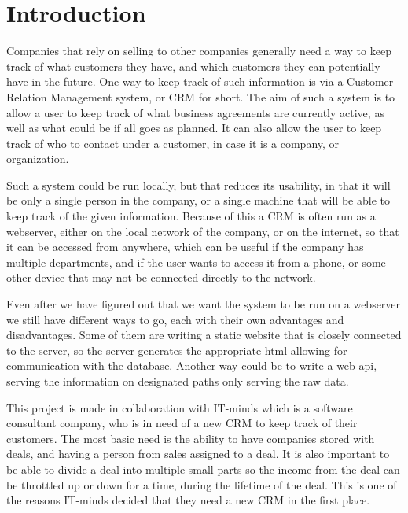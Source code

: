 \chapter{Introduction}
\label{chap:Introduction}
Companies that rely on selling to other companies generally need a way to keep track of
what customers they have, and which customers they can potentially have in the future.
One way to keep track of such information is via a Customer Relation Management system,
or CRM for short. The aim of such a system is to allow a user to keep track of what
business agreements are currently active, as well as what could be if all goes as planned.
It can also allow the user to keep track of who to contact under a customer, in case it is
a company, or organization.

Such a system could be run locally, but that reduces its usability, in that it will
be only a single person in the company, or a single machine that will be able to keep
track of the given information. Because of this a CRM is often run as a webserver, either
on the local network of the company, or on the internet, so that it can be accessed
from anywhere, which can be useful if the company has multiple departments, and if the
user wants to access it from a phone, or some other device that may not be connected
directly to the network.

Even after we have figured out that we want the system to be run on a webserver we still have
different ways to go, each with their own advantages and disadvantages. Some of them
are writing a static website that is closely connected to the server, so the server
generates the appropriate html allowing for communication with the database.
Another way could be to write a web-api, serving the information on designated paths
only serving the raw data.

This project is made in collaboration with IT-minds which is a software consultant company,
who is in need of a new CRM to keep track of their customers. The most basic need is
the ability to have companies stored with deals, and having a person from sales assigned
to a deal. It is also important to be able to divide a deal into multiple small parts
so the income from the deal can be throttled up or down for a time, during the lifetime
of the deal. This is one of the reasons IT-minds decided that they need a new CRM in the
first place.


